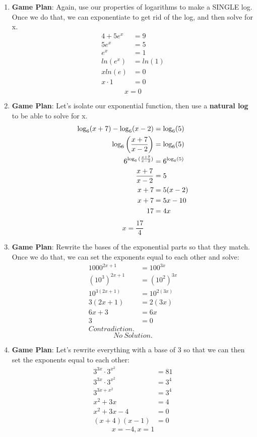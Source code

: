 \documentclass[12pt]{article}
\newenvironment{solution}[2][Solution]{\begin{trivlist}
\item[\hskip \labelsep {\bfseries #1}]}{\end{trivlist}}
\begin{document}
\begin{solution}{}
\begin{enumerate}[label=\alph*)]
    \item \textbf{Game Plan}: Again, use our properties of logarithms to make a SINGLE log. Once we do that, we can exponentiate to get rid of the log, and then solve for x.
    \begin{align*}
        4+5e^x &= 9 \\
        5e^x &= 5\\
        e^x &= 1 \\
        ln(e^x) &= ln(1) \\
        xln(e) & = 0 \\
        x\cdot 1 &= 0 \\
    \end{align*}
    $$\boxed{x = 0}$$
    
    \item \textbf{Game Plan}: Let's isolate our exponential function, then use a \textbf{natural log} to be able to solve for x.
    \begin{align*}
        \log_6(x+7) - \log_6(x-2) &= \log_6(5) \\
        \log_6{\bigg{(}\frac{x+7}{x-2}\bigg{)}} &= \log_6(5) \\
        6^{\log_6{(\frac{x+7}{x-2}})} &= 6^{\log_6(5)} \\
        \frac{x+7}{x-2} &= 5 \\
        x+7 &= 5(x-2) \\
        x+7 &= 5x - 10 \\
        17 &= 4x
    \end{align*}
    $$\boxed{x = \frac{17}{4}}$$
    
    \item \textbf{Game Plan}: Rewrite the bases of the exponential parts so that they match. Once we do that, we can set the exponents equal to each other and solve:
    \begin{align*}
        1000^{2x+1} &= 100^{3x} \\
        (10^3)^{2x+1} &= (10^2)^{3x} \\
        10^{3(2x+1)} &= 10^{2(3x)} \\
        3(2x+1) &= 2(3x) \\
        6x + 3 & =  6x \\
        3 &= 0 \\
        Contradiction. &
    \end{align*}
    $$\boxed{No\ Solution.}$$
    
    \item \textbf{Game Plan}: Let's rewrite everything with a base of 3 so that we can then set the exponents equal to each other:
    \begin{align*}
        3^{3x}\cdot3^{x^2} &= 81 \\
        3^{3x}\cdot3^{x^2} &= 3^4 \\
        3^{3x+x^2} &= 3^4 \\
        x^2 + 3x &= 4 \\
        x^2 + 3x - 4 &= 0 \\
        (x+4)(x-1) &= 0
    \end{align*}
    $$\boxed{x = -4, x = 1}$$
    

\end{enumerate}
\end{solution}
\end{document}
